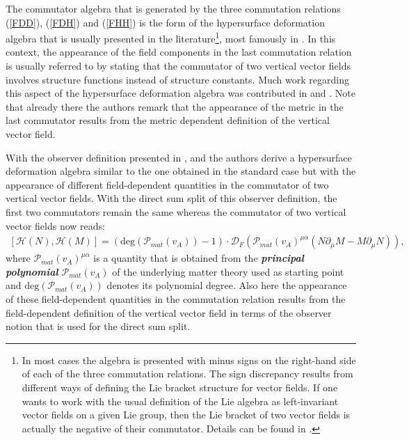The commutator algebra that is generated by the three commutation relations (\ref{FDD}), (\ref{FDH}) and (\ref{FHH}) is the form of the hypersurface deformation algebra that is usually presented in the literature\footnote{In most cases the algebra is presented with minus signs on the right-hand side of each of the three commutation relations. The sign discrepancy results from different ways of defining the Lie bracket structure for vector fields. If one wants to work with the usual definition of the Lie algebra as left-invariant vector fields on a given Lie group, then the Lie bracket of two vector fields is actually the negative of their commutator. Details can be found in \cite{1985AnPhy.164..288I}.}, most famously in \cite{HOJMAN197688}. In this context, the appearance of the field components in the last commutation relation is usually referred to by stating that the commutator of two vertical vector fields involves structure functions instead of structure constants. Much work regarding this aspect of the hypersurface deformation algebra was contributed in \cite{1985AnPhy.164..288I} and \cite{1985AnPhy.164..316I}. Note that already there the authors remark that the appearance of the metric in the last commutator results from the metric dependent definition of the vertical vector field. 

With the observer definition presented in \cite{2018PhRvD..97h4036D}, \cite{2011PhRvD..83d4047R} and \cite{Rivera} the authors derive a hypersurface deformation algebra similar to the one obtained in the standard case but with the appearance of different field-dependent quantities in the commutator of two vertical vector fields. With the direct sum split of this observer definition, the first two commutators remain the same whereas the commutator of two vertical vector fields now reads:
\begin{align}\label{PolyAlg}
    \left[\mathcal{H}(N), \mathcal{H}(M) \right] = \left(\mathrm{deg}(\mathcal{P}_{mat}(v_A)) -1\right ) \cdot  \mathcal{D}_F\left(\mathcal{P}_{mat}(v_A)^{\mu \alpha}( N\partial_{\mu} M - M \partial_{\mu}N  ) \right),
\end{align}
where $\mathcal{P}_{mat}(v_A)^{\mu \alpha}$ is a quantity that is obtained from the \textit{\textbf{principal polynomial}} $\mathcal{P}_{mat}(v_A)$ of the underlying matter theory used as starting point and $\mathrm{deg}(\mathcal{P}_{mat}(v_A))$ denotes its polynomial degree. Also here the appearance of these field-dependent quantities in the commutation relation results from the field-dependent definition of the vertical vector field in terms of the observer notion that is used for the direct sum split.
